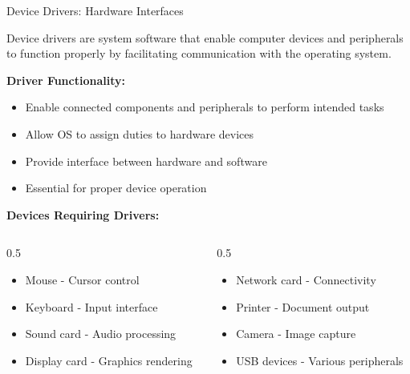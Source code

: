 \documentclass[aspectratio=169]{beamer}
\begin{document}
\begin{frame}{Device Drivers: Hardware Interfaces}
    \begin{definition}
        Device drivers are system software that enable computer devices and peripherals to function properly by facilitating communication with the operating system.
    \end{definition}
    \textbf{Driver Functionality:}
    \begin{itemize}
        \item Enable connected components and peripherals to perform intended tasks
        \item Allow OS to assign duties to hardware devices
        \item Provide interface between hardware and software
        \item Essential for proper device operation
    \end{itemize}
    
    \textbf{Devices Requiring Drivers:}
    \begin{columns}
        \begin{column}{0.5\textwidth}
            \begin{itemize}
                \item Mouse - Cursor control
                \item Keyboard - Input interface
                \item Sound card - Audio processing
                \item Display card - Graphics rendering
            \end{itemize}
        \end{column}
        \begin{column}{0.5\textwidth}
            \begin{itemize}
                \item Network card - Connectivity
                \item Printer - Document output
                \item Camera - Image capture
                \item USB devices - Various peripherals
            \end{itemize}
        \end{column}
    \end{columns}
    
    
\end{frame}
\end{document}
